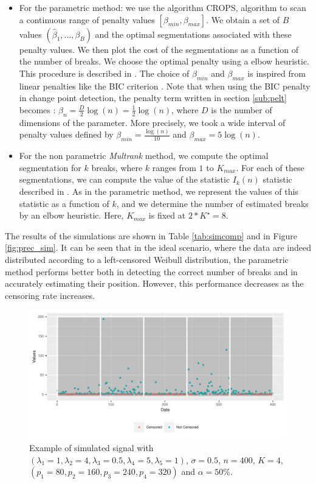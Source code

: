 \begin{itemize}
\begin{itemize}
        \item For the parametric method: we use the algorithm CROPS, algorithm to scan a continuous range of penalty values $[\beta_{min},\beta_{max}]$. We obtain a set of $B$ values $(\hat \beta_1,...,\beta_B)$ and the optimal segmentations associated with these penalty values. We then plot the cost of the segmentations as a function of the number of breaks. We choose the optimal penalty using a elbow heuristic. This procedure is described in \cite{haynes2014}. The choice of $\beta_{min}$ and $\beta_{max}$ is inspired from linear penalties like the BIC criterion \cite{YAO1988181}. Note that when using the BIC penalty in change point detection, the penalty term written in section \ref{sub:pelt} becomes : $\beta_n = \frac{D}{2}\log(n) = \frac{1}{2}\log(n)$, where $D$ is the number of dimensions of the parameter. More precisely, we took a wide interval of penalty values defined by $\beta_{min} = \frac{\log(n)}{10}$ and $\beta_{max} = 5\log(n)$.
        \item For the non parametric \textit{Multrank} method, we compute the optimal segmentation for $k$ breaks, where $k$ ranges from $1$ to $K_{max}$. For each of these segmentations, we can compute the value of the statistic $I_k(n)$ statistic described in \cite{lung2015}. As in the parametric method, we represent the values of this statistic as a function of $k$, and we determine the number of estimated breaks by an elbow heuristic. Here, $K_{max}$ is fixed at $2*K^\star = 8$.
    \end{itemize}
The results of the simulations are shown in Table \ref{tab:simcomp} and in Figure \ref{fig:prec_sim}. It can be seen that in the ideal scenario, where the data are indeed distributed according to a left-censored Weibull distribution, the parametric method performs better both in detecting the correct number of breaks and in accurately estimating their position. However, this performance decreases as the censoring rate increases.

\begin{figure}[ht]
    \centering
    \includegraphics{figs/Chap4/Ex_sim.pdf}
    \caption{Example of simulated signal with $(\lambda_1 = 1, \lambda_2 = 4, \lambda_3 = 0.5, \lambda_4 = 5, \lambda_5 = 1)$, $\sigma = 0.5 $, $n = 400$, $K = 4$, $(p_1 = 80,p_2 = 160,p_3 = 240,p_4 = 320)$ and $\alpha = 50\%$.}
    \label{fig:ex_sim}
\end{figure}


\end{itemize}

